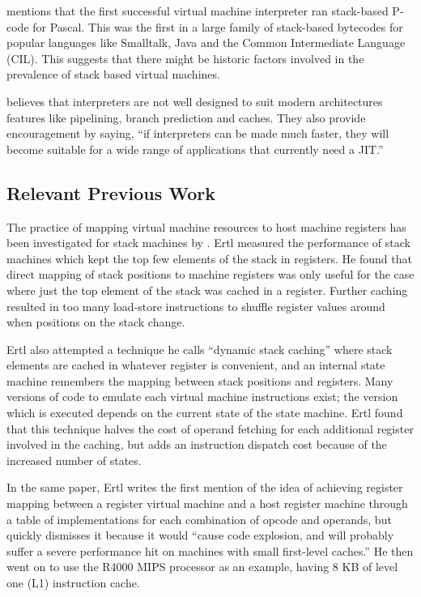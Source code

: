 		\cite{caseregistervm} mentions that the first successful virtual machine interpreter ran stack-based P-code for Pascal. This was the first in a large family of stack-based bytecodes for popular languages like Smalltalk, Java and the Common Intermediate Language (CIL). This suggests that there might be historic factors involved in the prevalence of stack based virtual machines.
		
		\cite{fastjava} believes that interpreters are not well designed to suit modern architectures features like pipelining, branch prediction and caches. They also provide encouragement by saying, ``if interpreters can be made much faster, they will become suitable for a wide range of applications that currently need a JIT.''
		
		
		\subsection{Relevant Previous Work}
		
		The practice of mapping virtual machine resources to host machine registers has been investigated for stack machines by \cite{stackcaching}. Ertl measured the performance of stack machines which kept the top few elements of the stack in registers. He found that direct mapping of stack positions to machine registers was only useful for the case where just the top element of the stack was cached in a register. Further caching resulted in too many load-store instructions to shuffle register values around when positions on the stack change.
		
		Ertl also attempted a technique he calls ``dynamic stack caching'' where stack elements are cached in whatever register is convenient, and an internal state machine remembers the mapping between stack positions and registers. Many versions of code to emulate each virtual machine instructions exist; the version which is executed depends on the current state of the state machine. Ertl found that this technique halves the cost of operand fetching for each additional register involved in the caching, but adds an instruction dispatch cost because of the increased number of states.
		
		In the same paper, Ertl writes the first mention of the idea of achieving register mapping between a register virtual machine and a host register machine through a table of implementations for each combination of opcode and operands, but quickly dismisses it because it would ``cause code explosion, and will probably suffer a severe performance hit on machines with small first-level caches.'' He then went on to use the R4000 MIPS processor as an example, having 8 KB of level one (L1) instruction cache.
	
